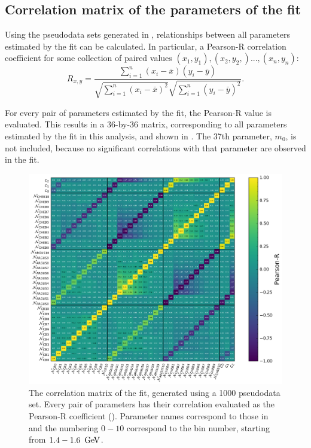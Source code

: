 \subsection{Correlation matrix of the parameters of the \texorpdfstring{\Mbc}{Mbc} fit}\label{sec:correlation_matrix}

Using the pseudodata sets generated in , relationships between all parameters estimated by the \Mbc fit can be calculated.
In particular, a Pearson-R correlation coefficient for some collection of paired values ${(x_1,y_1),(x_2,y_2,)...,(x_n,y_n)}$:
\begin{equation}\label{eq:pearson_r}
    R_{x,y}=\frac{\sum_{i=1}^n\left(x_i-\bar{x}\right)\left(y_i-\bar{y}\right)}{\sqrt{\sum_{i=1}^n\left(x_i-\bar{x}\right)^2} \sqrt{\sum_{i=1}^n\left(y_i-\bar{y}\right)^2}}.
\end{equation}

For every pair of parameters estimated by the \Mbc fit, the Pearson-R value is evaluated.
This results in a 36-by-36 matrix, corresponding to all parameters estimated by the \Mbc fit in this analysis, and shown in .
The 37th parameter, $m_0$, is not included, because no significant correlations with that parameter are observed in the fit.
\begin{figure}[htbp!]
    \centering
    \includegraphics[width=1.1\textwidth]{figures/mc_validation/correlation_matrix.pdf}
    \caption{\label{fig:correlation_matrix}The correlation matrix of the \Mbc fit, generated using a 1000 pseudodata set.
    Every pair of parameters has their correlation evaluated as the Pearson-R coefficient ().
    Parameter names correspond to those in  and the numbering $0-10$ correspond to the bin number, starting from $1.4-1.6~\mathrm{\,Ge\kern -0.1em V}$.
    }
\end{figure}

